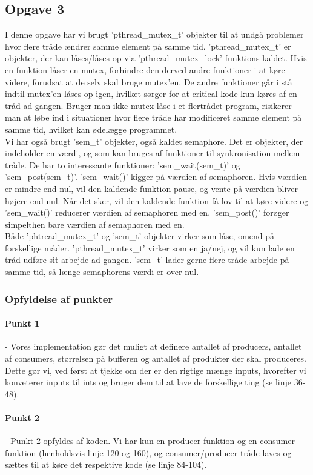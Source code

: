 \subsection{Opgave 3}
\label{O3}
I denne opgave har vi brugt 'pthread_mutex_t' objekter til at undgå problemer hvor flere tråde ændrer samme element på samme tid. 'pthread_mutex_t' er objekter, der kan låses/låses op via 'pthread_mutex_lock'-funktions kaldet. Hvis en funktion låser en mutex, forhindre den derved andre funktioner i at køre videre, forudsat at de selv skal bruge mutex'en. De andre funktioner går i stå indtil mutex'en låses op igen, hvilket sørger for at critical kode kun køres af en tråd ad gangen. Bruger man ikke mutex låse i et flertrådet program, risikerer man at løbe ind i situationer hvor flere tråde har modificeret samme element på samme tid, hvilket kan ødelægge programmet.
\\ Vi har også brugt 'sem_t' objekter, også kaldet semaphore. Det er objekter, der indeholder en værdi, og som kan bruges af funktioner til synkronisation mellem tråde. De har to interessante funktioner: 'sem_wait(sem_t)' og 'sem_post(sem_t)'. 'sem_wait()' kigger på værdien af semaphoren. Hvis værdien er mindre end nul, vil den kaldende funktion pause, og vente på værdien bliver højere end nul. Når det sker, vil den kaldende funktion få lov til at køre videre og 'sem_wait()' reducerer værdien af semaphoren med en. 'sem_post()' forøger simpelthen bare værdien af semaphoren med en.
\\ Både 'phtread_mutex_t' og 'sem_t' objekter virker som låse, omend på forskellige måder. 'pthread_mutex_t' virker som en ja/nej, og vil kun lade en tråd udføre sit arbejde ad gangen. 'sem_t' lader gerne flere tråde arbejde på samme tid, så længe semaphorens værdi er over nul.

\subsubsection{Opfyldelse af punkter}
\label{O3_Punkter}
\paragraph{Punkt 1} - Vores implementation gør det muligt at definere antallet af producers, antallet af consumers, størrelsen på bufferen og antallet af produkter der skal produceres. Dette gør vi, ved først at tjekke om der er den rigtige mænge inputs, hvorefter vi konveterer inputs til ints og bruger dem til at lave de forskellige ting (se linje 36-48).
\paragraph{Punkt 2} - Punkt 2 opfyldes af koden. Vi har kun en producer funktion og en consumer funktion (henholdsvis linje 120 og 160), og consumer/producer tråde laves og sættes til at køre det respektive kode (se linje 84-104).
